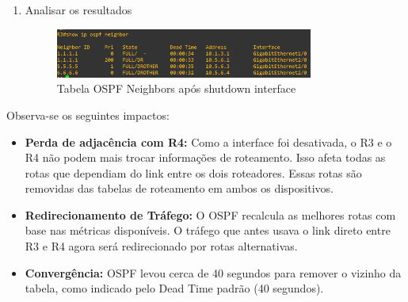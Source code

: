 \documentclass[11pt,english, openright, oneside]{book}
\begin{document}
\begin{enumerate}
\begin{enumerate}
          \item Analisar os resultados
          \begin{figure}[H]
            \centering
            \includegraphics[width=0.8\textwidth]{imagens/Tarefa6/30.link_failure_2.png}
            \caption{Tabela OSPF Neighbors após shutdown interface}
            \label{fig:config46}
          \end{figure}
        \end{enumerate}

        Observa-se os seguintes impactos:
        \begin{itemize}
          \item \textbf{Perda de adjacência com R4:} Como a interface foi desativada, o R3 e o R4 não podem mais trocar informações de roteamento.
          Isso afeta todas as rotas que dependiam do link entre os dois roteadores. Essas rotas são removidas das tabelas de roteamento em ambos os dispositivos.
          \item \textbf{Redirecionamento de Tráfego:} O OSPF recalcula as melhores rotas com base nas métricas disponíveis.
          O tráfego que antes usava o link direto entre R3 e R4 agora será redirecionado por rotas alternativas.
          \item \textbf{Convergência:} OSPF levou cerca de 40 segundos para remover o vizinho da tabela, como indicado pelo Dead Time padrão (40 segundos).
        \end{itemize} \par \vspace{0.8cm}
  

\end{enumerate}
\end{document}
